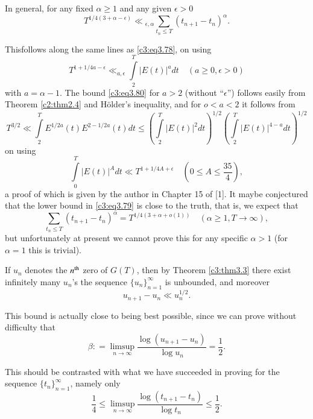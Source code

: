 In general, for any fixed $\alpha \geq 1$ and any given $\epsilon > 0$
\begin{equation}
  T^{1/4 (3 + \alpha - \epsilon)} \ll {}_{\epsilon , \alpha} \sum_{t_n
  \leq T} (t_{n+1}- t_n)^{\alpha}. \label{c3:eq3.79}
\end{equation}

This\pageoriginale follows along the same lines as \eqref{c3:eq3.78},
on using
\begin{equation}
  T^{1+ 1/4 a- \epsilon} \ll_{a, \epsilon} \int\limits_2^T |E(t)|^a dt
  \quad (a \geq 0, \epsilon > 0) \label{c3:eq3.80}
\end{equation}
with $a = \alpha-1$. The bound \eqref{c3:eq3.80} for $a> 2$ (without
``$\epsilon$'') follows easily from Theorem \ref{c2:thm2.4} and
H\"older's inequality, and for $o < a < 2$ it follows from 
$$
T^{3/2} \ll \int\limits^T_2 E^{1/2 a} (t) E^{2-1/2a}(t) dt \leq
\left(\int\limits_2^T |E(t)|^2 dt \right)^{1/2} \left(\int\limits_2^T
|E (t)|^{4-a} dt \right)^{1/2}
$$
on using
\begin{equation}
  \int\limits_0^T |E(t)|^A dt \ll T^{1+ 1/4A + \epsilon} \quad \left(0 \leq
  A \leq \frac{35}{4}\right),\label{c3:eq3.81}
\end{equation}
a proof of which is given by the author in Chapter 15 of [1]. It maybe
conjectured that the lower bound in \eqref{c3:eq3.79} is close to the
truth, that is, we expect that
\begin{equation}
  \sum_{t_n \leq T} (t_{n+1}- t_n)^\alpha = T^{1/4(3 + \alpha + o
    (1))} \quad (\alpha \geq 1, T \to \infty),\label{c3:eq3.82}
\end{equation}
but unfortunately at present we cannot prove this for any specific
$\alpha> 1$ (for $\alpha=1$ this is trivial).

If $u_n$ denotes the $n^{\rm th}$ zero of $G(T)$, then by Theorem
\ref{c3:thm3.3} there exist infinitely many $u_n$'s the sequence
$\{u_n\}^\infty_{n=1}$ is unbounded, and moreover
$$
u_{n+1} - u_n \ll u_n^{1/2}.
$$

This bound is actually close to being best possible, since we can
prove without difficulty that
$$
\beta: = \limsup_{n \to \infty} \frac{\log (u_{n+1}- u_n)}{\log u_n} =
\frac{1}{2}. 
$$

This should be contrasted with what we have succeeded in proving for
the sequence $\{ t_n\}_{n=1}^\infty$, namely only
$$
\frac{1}{4} \leq \limsup_{n \to \infty} \frac{\log (t_{n+1}-
  t_n)}{\log t_n} \leq \frac{1}{2}.
$$


